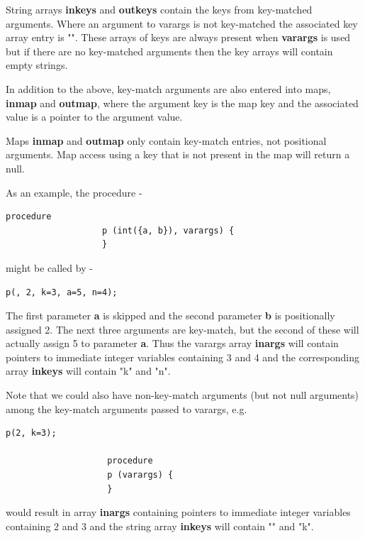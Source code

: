                 String arrays {\bf inkeys} and {\bf outkeys} contain the keys
                from key-matched arguments. Where an argument to varargs is not
                key-matched the associated key array entry is "". These arrays
                of keys are always present when {\bf varargs} is used but if
                there are no key-matched arguments then the key arrays will
                contain empty strings.
                
                In addition to the above, key-match arguments are also entered
                into maps, {\bf inmap} and {\bf outmap}, where the argument key
                is the map key and the associated value is a pointer to the
                argument value.
                
                Maps {\bf inmap} and {\bf outmap} only contain key-match
                entries, not positional arguments. Map access using a key that
                is not present in the map will return a null.                
                
                As an example, the procedure -
                \begin{lstlisting}[gobble=16, language=threepl]
                   procedure
                   p (int({a, b}), varargs) {
                   }
                \end{lstlisting}
                might be called by -
                \begin{lstlisting}[gobble=16, language=threepl]
                    p(, 2, k=3, a=5, n=4);
                \end{lstlisting}
                The first parameter {\bf a} is skipped and the second parameter
                {\bf b} is positionally assigned 2. The next three arguments are
                key-match, but the second of these will actually assign 5 to
                parameter {\bf a}. Thus the varargs array {\bf inargs} will contain
                pointers to immediate integer variables containing 3 and 4 and the
                corresponding array {\bf inkeys} will contain "k" and "n".
                
                Note that we could also have non-key-match arguments (but not null
                arguments) among the key-match arguments passed to varargs, e.g.
                \begin{lstlisting}[gobble=16, language=threepl]
                    p(2, k=3);

                    procedure
                    p (varargs) {
                    }
                \end{lstlisting}
                would result in array {\bf inargs} containing pointers to
                immediate integer variables containing 2 and 3 and the
                string array {\bf inkeys} will contain "" and "k".
                
